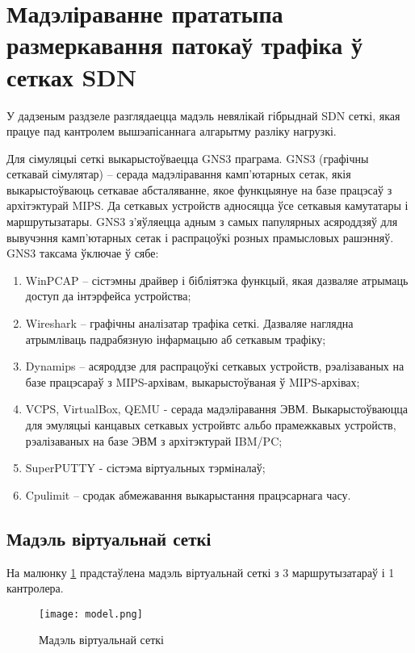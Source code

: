 \section{Мадэліраванне прататыпа размеркавання патокаў трафіка ў сетках SDN}

У дадзеным раздзеле разглядаецца мадэль невялікай гібрыднай SDN сеткі, якая працуе
пад кантролем вышэапісаннага алгарытму разліку нагрузкі.

Для сімуляцыі сеткі выкарыстоўваецца GNS3 праграма.
GNS3 (графічны сеткавай сімулятар) -- серада мадэліравання камп'ютарных сетак, якія выкарыстоўваюць сеткавае абсталяванне, якое функцыянуе на базе працэсаў з архітэктурай MIPS. Да сеткавых устройств адносяцца ўсе сеткавыя камутатары і маршрутызатары. GNS3 з'яўляецца адным з самых папулярных асяроддзяў для вывучэння камп'ютарных сетак і распрацоўкі розных прамысловых рашэнняў. GNS3 таксама ўключае ў сябе:
\begin{enumerate}
    \item WinPCAP -- сістэмны драйвер і бібліятэка функцый, якая дазваляе атрымаць доступ да інтэрфейса устройства;
    \item Wireshark -- графічны аналізатар трафіка сеткі. Дазваляе наглядна атрымліваць падрабязную інфармацыю аб сеткавым трафіку;
    \item Dynamips -- асяроддзе для распрацоўкі сеткавых устройств, рэалізаваных на базе працэсараў з MIPS-архівам, выкарыстоўваная ў MIPS-архівах;
    \item VCPS, VirtualBox, QEMU - серада мадэліравання ЭВМ. Выкарыстоўваюцца для эмуляцыі канцавых сеткавых устройвтс альбо прамежкавых устройств, рэалізаваных на базе ЭВМ з архітэктурай IBM/PC;
    \item SuperPUTTY - сістэма віртуальных тэрміналаў;
    \item Cpulimit -- сродак абмежавання выкарыстання працэсарнага часу.
\end{enumerate}

\subsection{Мадэль віртуальнай сеткі}

На малюнку \ref{img: model} прадстаўлена мадэль віртуальнай сеткі з 3 маршрутызатараў і 1 кантролера.

\begin{figure}[h!]
    \centering
    \texttt{[image: model.png]}
    \caption{Мадэль віртуальнай сеткі}
    \label{img: model} 
\end{figure}

